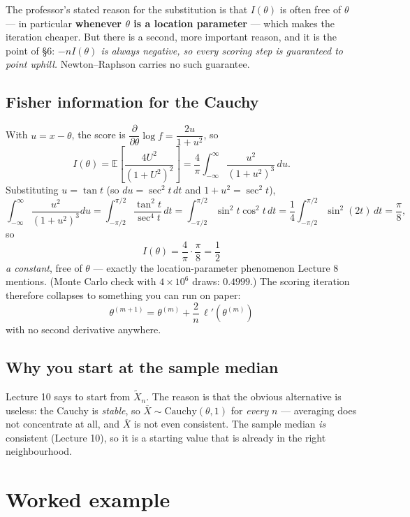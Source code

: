 \documentclass[11pt]{article}
\newcommand{\E}{\mathbb{E}}
\newcommand{\Xbar}{\overline{X}}
\begin{document}
The professor's stated reason for the substitution is that $I(\theta)$ is often free of
$\theta$ --- in particular \textbf{whenever $\theta$ is a location parameter} --- which makes
the iteration cheaper. But there is a second, more important reason, and it is the point of
\S6: \emph{$-nI(\theta)$ is always negative, so every scoring step is guaranteed to point
uphill.} Newton--Raphson carries no such guarantee.

\subsection{Fisher information for the Cauchy}

With $u=x-\theta$, the score is $\dfrac{\partial}{\partial\theta}\log f=\dfrac{2u}{1+u^2}$, so
\[
I(\theta)=\E\left[\frac{4U^2}{(1+U^2)^2}\right]
=\frac{4}{\pi}\int_{-\infty}^{\infty}\frac{u^{2}}{(1+u^{2})^{3}}\,du .
\]
Substituting $u=\tan t$ (so $du=\sec^2t\,dt$ and $1+u^2=\sec^2t$),
\[
\int_{-\infty}^{\infty}\frac{u^2}{(1+u^2)^3}du
=\int_{-\pi/2}^{\pi/2}\frac{\tan^2 t}{\sec^4 t}\,dt
=\int_{-\pi/2}^{\pi/2}\sin^2t\cos^2t\,dt
=\frac14\int_{-\pi/2}^{\pi/2}\sin^2(2t)\,dt=\frac{\pi}{8},
\]
so
\[
\boxed{\ I(\theta)=\frac4\pi\cdot\frac\pi8=\frac12\ }
\]
\emph{a constant}, free of $\theta$ --- exactly the location-parameter phenomenon Lecture 8
mentions. (Monte Carlo check with $4\times10^6$ draws: $0.4999$.) The scoring iteration
therefore collapses to something you can run on paper:
\[
\boxed{\ \theta^{(m+1)}=\theta^{(m)}+\frac{2}{n}\,\ell'(\theta^{(m)})\ }
\]
with no second derivative anywhere.

\subsection{Why you start at the sample median}

Lecture 10 says to start from $\tilde X_n$. The reason is that the obvious alternative is
useless: the Cauchy is \emph{stable}, so $\Xbar\sim\mathrm{Cauchy}(\theta,1)$ for
\emph{every} $n$ --- averaging does not concentrate at all, and $\Xbar$ is not even consistent.
The sample median \emph{is} consistent (Lecture 10), so it is a starting value that is already
in the right neighbourhood.

\section{Worked example}
\end{document}
